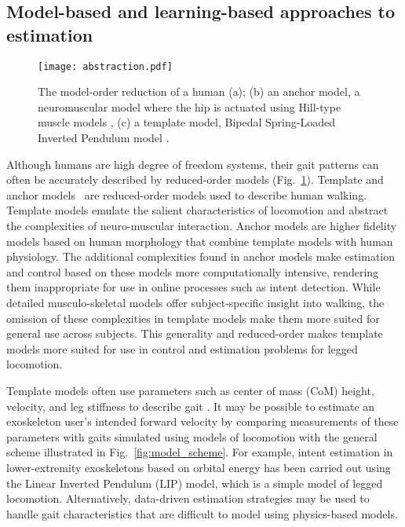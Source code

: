 \subsection{Model-based and learning-based approaches to estimation}\label{sec:model_v_learning}
\begin{figure}
	\centering
	\texttt{[image: abstraction.pdf]}
	\caption[The model-order reduction of a human (a); (b) an anchor model, a neuromuscular model where the hip is actuated using Hill-type muscle models, (c) a template model, Bipedal Spring-Loaded Inverted Pendulum model]{The model-order reduction of a human (a); (b) an anchor model, a neuromuscular model where the hip is actuated using Hill-type muscle models \cite{davoodi2019template}, (c) a template model, Bipedal Spring-Loaded Inverted Pendulum model \cite{geyer2006compliant}. }\label{fig:abstraction}
\end{figure}

Although humans are high degree of freedom systems, their gait patterns can often be accurately described by reduced-order models (Fig.~\ref{fig:abstraction}). Template and anchor models~\cite{full1999templates} are reduced-order models used to describe human walking. Template models emulate the salient characteristics of locomotion and abstract the complexities of neuro-muscular interaction. Anchor models are higher fidelity models based on human morphology that combine template models with human physiology. The additional complexities found in anchor models make estimation and control based on these models more computationally intensive, rendering them inappropriate for use in online processes such as intent detection. While detailed musculo-skeletal models offer subject-specific insight into walking, the omission of these complexities in template models make them more suited for general use across subjects. This generality and reduced-order makes template models more suited for use in control and estimation problems for legged locomotion.

Template models often use parameters such as center of mass (CoM) height, velocity, and leg stiffness to describe gait \cite{geyer2006compliant,liu2015dynamic,full1999templates,sharbafi2015fmch}. It may be possible to estimate an exoskeleton user's intended forward velocity by comparing measurements of these parameters with gaits simulated using models of locomotion with the general scheme illustrated in Fig.~\ref{fig:model_scheme}. For example, intent estimation in lower-extremity exoskeletons based on orbital energy \cite{chen2018dynamic} has been carried out using the Linear Inverted Pendulum (LIP) model, which is a simple model of legged locomotion.  Alternatively, data-driven estimation strategies \cite{ge2011neural, kalinowska2019data, joukov2017rhythmic} may be used to handle gait characteristics that are difficult to model using physics-based models.
%

